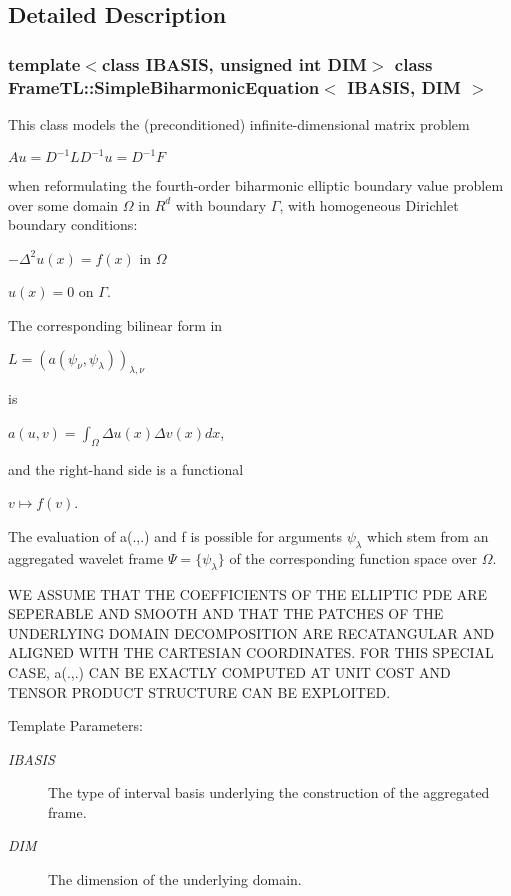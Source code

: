 \subsection{Detailed Description}
\subsubsection*{template$<$class IBASIS, unsigned int DIM$>$ class FrameTL::SimpleBiharmonicEquation$<$ IBASIS, DIM $>$}

This class models the (preconditioned) infinite-dimensional matrix problem

$Au = D^{-1}LD^{-1}u = D^{-1}F$

when reformulating the fourth-order biharmonic elliptic boundary value problem over some domain $\Omega$ in $R^d$ with boundary $\Gamma$, with homogeneous Dirichlet boundary conditions:

$-\Delta^2 u(x) = f(x)$ in $\Omega$\par
 $u(x) = 0 $ on $\Gamma$.

The corresponding bilinear form in

$L = (a(\psi_\nu,\psi_\lambda))_{\lambda,\nu}$

is

$a(u,v) = \int_\Omega \Delta u(x) \Delta v(x) dx$,

and the right-hand side is a functional

$v \mapsto f(v)$.

The evaluation of a(.,.) and f is possible for arguments $\psi_\lambda$ which stem from an aggregated wavelet frame $\Psi=\{\psi_\lambda\}$ of the corresponding function space over $\Omega$.

WE ASSUME THAT THE COEFFICIENTS OF THE ELLIPTIC PDE ARE SEPERABLE AND SMOOTH AND THAT THE PATCHES OF THE UNDERLYING DOMAIN DECOMPOSITION ARE RECATANGULAR AND ALIGNED WITH THE CARTESIAN COORDINATES. FOR THIS SPECIAL CASE, a(.,.) CAN BE EXACTLY COMPUTED AT UNIT COST AND TENSOR PRODUCT STRUCTURE CAN BE EXPLOITED.

\begin{Desc}
\item[Template Parameters:]
\begin{description}
\item[{\em IBASIS}]The type of interval basis underlying the construction of the aggregated frame. \item[{\em DIM}]The dimension of the underlying domain. \end{description}
\end{Desc}


